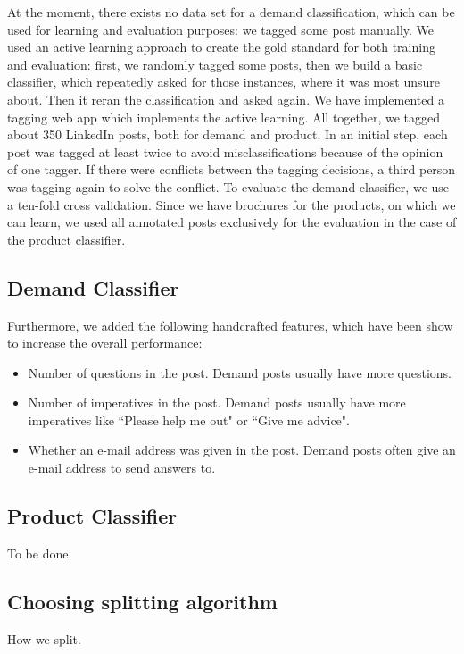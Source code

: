 At the moment, there exists no data set for a demand classification, which can be used for learning and evaluation purposes: we tagged some post manually.
We used an active learning \nr approach to create the gold standard for both training and evaluation:
first, we randomly tagged some posts, then we build a basic classifier, which repeatedly asked for those instances, where it was most unsure about.
Then it reran the classification and asked again.
We have implemented a tagging web app which implements the active learning.
All together, we tagged about 350 LinkedIn posts, both for demand and product.
In an initial step, each post was tagged at least twice to avoid misclassifications because of the opinion of one tagger.
If there were conflicts between the tagging decisions, a third person was tagging again to solve the conflict.
To evaluate the demand classifier, we use a ten-fold cross validation.
Since we have brochures for the products, on which we can learn, we used all annotated posts exclusively for the evaluation in the case of the product classifier.


\subsection{Demand Classifier}

Furthermore, we added the following handcrafted  features, which have been show to increase the overall performance:
\begin{itemize}
	\item Number of questions in the post. Demand posts usually have more questions.
	\item Number of imperatives in the post. Demand posts usually have more imperatives like ``Please help me out" or ``Give me advice".
	\item Whether an e-mail address was given in the post. Demand posts often give an e-mail address to send answers to.
\end{itemize}

\subsection{Product Classifier}
To be done.

\subsection{Choosing splitting algorithm}
How we split.
